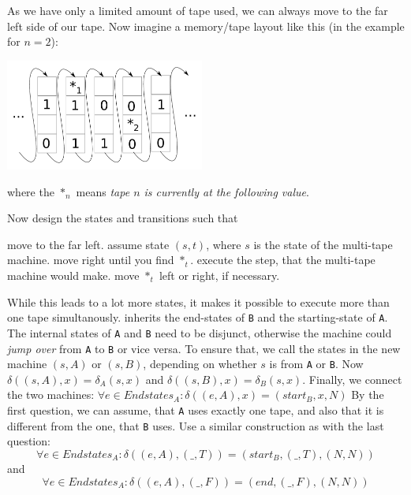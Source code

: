 \begin{Answer}
	\Question As we have only a limited amount of tape used, we can always move 
		to the far left side of our tape. Now imagine a memory/tape layout like 
		this (in the example for $n=2$):
		\begin{center}
			\includegraphics[width=0.49\textwidth]{computability/completeness/pictures/multitape}
		\end{center}
		where the $*_n$ means {\em tape $n$ is currently at the following value}. 
		
		Now design the states and transitions such that
		\begin{algorithmic}[1]
				\State move to the far left.
				\State assume state $(s, t)$, where $s$ is the state of the multi-tape machine.
				\State move right until you find $*_t$.
				\State execute the step, that the multi-tape machine would make.
				\State move $*_t$ left or right, if necessary.
			\EndFor
		\end{algorithmic}
		While this leads to a lot more states, it makes it possible to execute 
		more than one tape simultanously.
	 inherits the end-states of {\tt B} and the 
		starting-state of {\tt A}. The internal states of {\tt A} and {\tt B} 
		need to be disjunct, otherwise the machine could {\em jump over} from 
		{\tt A} to {\tt B} or vice versa. To ensure that, we call the states in 
		the new machine $(s, A)$ or $(s, B)$, depending on whether $s$ is from 
		{\tt A} or {\tt B}. Now $\delta((s,A), x) = \delta_A(s,x)$ and
		$\delta((s,B), x) = \delta_B(s,x)$. Finally, we connect the two machines:
		$\forall e\in Endstates_A: \delta((e, A), x) = (start_B, x, N)$
	\Question 
		\subQuestion By the first question, we can assume, that {\tt A}  uses exactly 
			one tape, and also that it is different from the one, that {\tt B} 
			uses. Use a similar construction as with the last question:
			\[\forall e\in Endstates_A: \delta((e,A), (\_, T)) = (start_B, (\_, T), (N, N))\]
			and
			\[\forall e\in Endstates_A: \delta((e,A), (\_, F)) = (end, (\_, F), (N, N))\]


\end{Answer}
